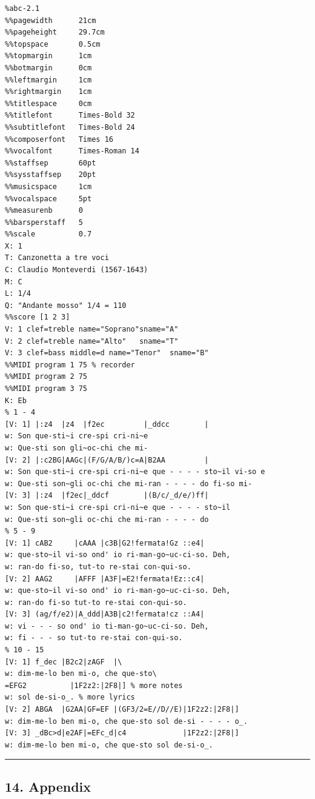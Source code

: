 \documentclass[oneside]{book}
\begin{document}
\begin{verbatim}
%abc-2.1
%%pagewidth      21cm
%%pageheight     29.7cm
%%topspace       0.5cm
%%topmargin      1cm
%%botmargin      0cm
%%leftmargin     1cm
%%rightmargin    1cm
%%titlespace     0cm
%%titlefont      Times-Bold 32
%%subtitlefont   Times-Bold 24
%%composerfont   Times 16
%%vocalfont      Times-Roman 14
%%staffsep       60pt
%%sysstaffsep    20pt
%%musicspace     1cm
%%vocalspace     5pt
%%measurenb      0
%%barsperstaff   5
%%scale          0.7
X: 1
T: Canzonetta a tre voci
C: Claudio Monteverdi (1567-1643)
M: C
L: 1/4
Q: "Andante mosso" 1/4 = 110
%%score [1 2 3]
V: 1 clef=treble name="Soprano"sname="A"
V: 2 clef=treble name="Alto"   sname="T"
V: 3 clef=bass middle=d name="Tenor"  sname="B"
%%MIDI program 1 75 % recorder
%%MIDI program 2 75
%%MIDI program 3 75
K: Eb
% 1 - 4
[V: 1] |:z4  |z4  |f2ec         |_ddcc        |
w: Son que-sti~i cre-spi cri-ni~e
w: Que-sti son gli~oc-chi che mi-
[V: 2] |:c2BG|AAGc|(F/G/A/B/)c=A|B2AA         |
w: Son que-sti~i cre-spi cri-ni~e que - - - - sto~il vi-so e
w: Que-sti son~gli oc-chi che mi-ran - - - - do fi-so mi-
[V: 3] |:z4  |f2ec|_ddcf        |(B/c/_d/e/)ff|
w: Son que-sti~i cre-spi cri-ni~e que - - - - sto~il
w: Que-sti son~gli oc-chi che mi-ran - - - - do
% 5 - 9
[V: 1] cAB2     |cAAA |c3B|G2!fermata!Gz ::e4|
w: que-sto~il vi-so ond' io ri-man-go~uc-ci-so. Deh,
w: ran-do fi-so, tut-to re-stai con-qui-so.
[V: 2] AAG2     |AFFF |A3F|=E2!fermata!Ez::c4|
w: que-sto~il vi-so ond' io ri-man-go~uc-ci-so. Deh,
w: ran-do fi-so tut-to re-stai con-qui-so.
[V: 3] (ag/f/e2)|A_ddd|A3B|c2!fermata!cz ::A4|
w: vi - - - so ond' io ti-man-go~uc-ci-so. Deh,
w: fi - - - so tut-to re-stai con-qui-so.
% 10 - 15
[V: 1] f_dec |B2c2|zAGF  |\
w: dim-me-lo ben mi-o, che que-sto\
=EFG2          |1F2z2:|2F8|] % more notes
w: sol de-si-o_. % more lyrics
[V: 2] ABGA  |G2AA|GF=EF |(GF3/2=E//D//E)|1F2z2:|2F8|]
w: dim-me-lo ben mi-o, che que-sto sol de-si - - - - o_.
[V: 3] _dBc>d|e2AF|=EFc_d|c4             |1F2z2:|2F8|]
w: dim-me-lo ben mi-o, che que-sto sol de-si-o_.
\end{verbatim}

\begin{center}\rule{0.5\linewidth}{\linethickness}\end{center}

\hypertarget{appendix}{\subsection{14. Appendix}\label{appendix}}
\end{document}
